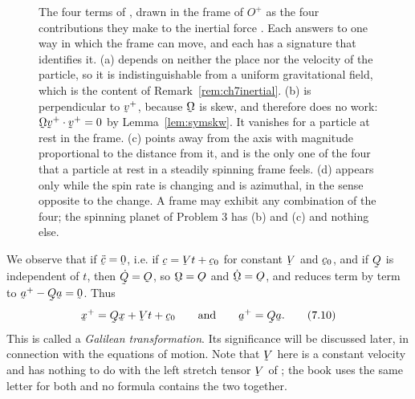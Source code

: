 \begin{figure}[htbp]
\caption{The four terms of , drawn in the frame of $O^{+}$ as
the four contributions they make to the inertial force . Each
answers to one way in which the frame can move, and each has a signature
that identifies it. (a) depends on neither the place nor the velocity of
the particle, so it is indistinguishable from a uniform gravitational
field, which is the content of Remark~\ref{rem:ch7inertial}. (b) is
perpendicular to $\bv^{+}$, because $\bOm$ is skew, and therefore does no
work: $\ip{\bOm\bv^{+}}{\bv^{+}}=0$ by Lemma~\ref{lem:symskw}. It
vanishes for a particle at rest in the frame. (c) points away from the
axis with magnitude proportional to the distance from it, and is the only
one of the four that a particle at rest in a steadily spinning frame
feels. (d) appears only while the spin rate is changing and is
azimuthal, in the sense opposite to the change. A frame may exhibit any
combination of the four; the spinning planet of Problem 3 has (b) and (c)
and nothing else.}
\label{fig:ch7fourterms}
\end{figure}

We observe that if $\ddot\bc=\bze$, i.e. if $\bc=\bV t+\bc_{0}$ for
constant $\bV$ and $\bc_{0}$, and if $\bQ$ is independent of $t$, then
$\dot\bQ=\Ob$, so $\bOm=\Ob$ and $\dot\bOm=\Ob$, and  reduces
term by term to $\ba^{+}-\bQ\ba=\bze$. Thus
\begin{equation}
   \bx^{+}=\bQ\bx+\bV t+\bc_{0}
   \qquad\text{and}\qquad
   \ba^{+}=\bQ\ba .
   \tag{7.10}\label{eq:7.10}
\end{equation}
This is called a \emph{Galilean transformation}. Its significance will be
discussed later, in connection with the equations of motion. Note that
$\bV$ here is a constant velocity and has nothing to do with the left
stretch tensor $\bV$ of ; the book uses the same letter for
both and no formula contains the two together.

